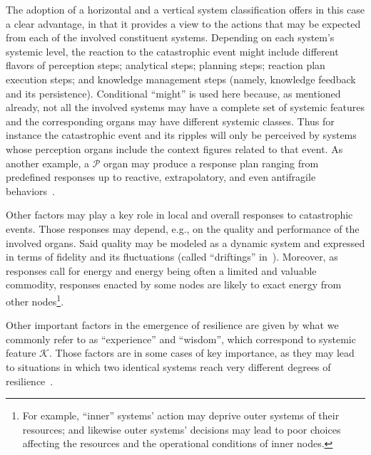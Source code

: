 \documentclass[twocolumn]{svjour3}
\def\P{\hbox{$\mathcal{P}$}}
\def\K{\hbox{$\mathcal{K}$}}
\begin{document}
The adoption of a horizontal and a vertical system classification offers in this case
a clear advantage, in that it provides a view to the actions that may be
expected from each of the involved constituent systems.
Depending on each system's systemic level, the reaction to the catastrophic event might include
different flavors of
perception steps; analytical steps; planning steps; reaction
plan execution steps; and knowledge management steps (namely, knowledge feedback and its persistence).
Conditional ``might'' is used here
because, as mentioned already, not all the involved systems may have a complete set of systemic features
and the corresponding organs may have different systemic classes.
Thus for instance the catastrophic event and its ripples will only be perceived by systems
whose perception organs include the
context figures related to that event. As another example, a \P{} organ may produce a
response plan ranging from predefined responses up to reactive, extrapolatory,
and even antifragile behaviors~\cite{DF15b}.


Other factors may play a key role in local and overall responses to catastrophic events.
Those responses may depend, e.g., on the quality and performance of the involved organs. Said quality 
may be modeled as a dynamic system and expressed in terms of fidelity and its fluctuations
(called ``driftings'' in~\cite{DBLP:journals/corr/FlorioP15,DF14a}).
Moreover, as responses call for energy and energy being often a limited and valuable commodity, responses
enacted by some nodes are likely to exact energy from other nodes\footnote{For
	example, ``inner'' systems' action may deprive outer systems of their resources;
	and likewise outer systems' decisions may lead to poor 
	choices affecting the resources and the operational conditions of inner nodes.}.

Other important factors in the emergence of resilience
are given by what we commonly refer to as ``experience'' and ``wisdom'', which
correspond to systemic feature \K. Those factors are in some cases of key importance,
as they may lead to situations in which two identical systems reach very different degrees
of resilience~\cite{Washburn15}.
\end{document}
